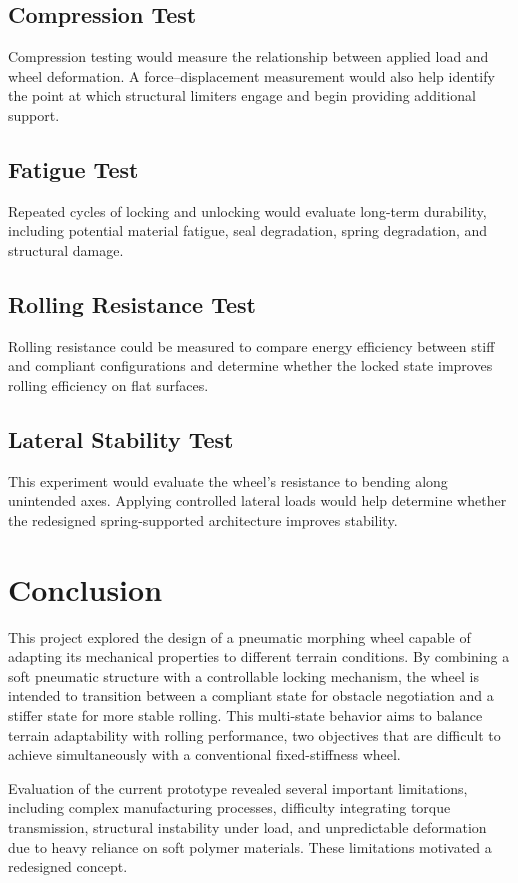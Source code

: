 \documentclass[11pt]{article}
\begin{document}
\subsection*{Compression Test}
Compression testing would measure the relationship between applied load and wheel deformation. A force--displacement measurement would also help identify the point at which structural limiters engage and begin providing additional support.

\subsection*{Fatigue Test}
Repeated cycles of locking and unlocking would evaluate long-term durability, including potential material fatigue, seal degradation, spring degradation, and structural damage.

\subsection*{Rolling Resistance Test}
Rolling resistance could be measured to compare energy efficiency between stiff and compliant configurations and determine whether the locked state improves rolling efficiency on flat surfaces.

\subsection*{Lateral Stability Test}
This experiment would evaluate the wheel's resistance to bending along unintended axes. Applying controlled lateral loads would help determine whether the redesigned spring-supported architecture improves stability.

\section{Conclusion}
This project explored the design of a pneumatic morphing wheel capable of adapting its mechanical properties to different terrain conditions. By combining a soft pneumatic structure with a controllable locking mechanism, the wheel is intended to transition between a compliant state for obstacle negotiation and a stiffer state for more stable rolling. This multi-state behavior aims to balance terrain adaptability with rolling performance, two objectives that are difficult to achieve simultaneously with a conventional fixed-stiffness wheel.

Evaluation of the current prototype revealed several important limitations, including complex manufacturing processes, difficulty integrating torque transmission, structural instability under load, and unpredictable deformation due to heavy reliance on soft polymer materials. These limitations motivated a redesigned concept.
\end{document}

